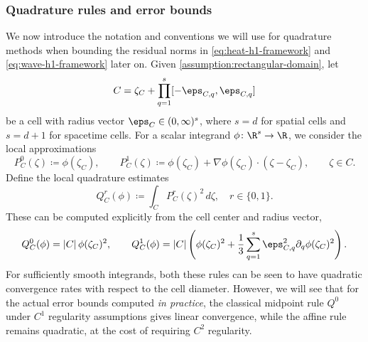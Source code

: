 \subsubsection{Quadrature rules and error bounds}
\label{subsubsec:cellwise-quadrature-bounds}
We now introduce the notation and conventions we will use for quadrature methods when bounding the residual norms in \eqref{eq:heat-h1-framework} and \eqref{eq:wave-h1-framework} later on. Given \cref{assumption:rectangular-domain}, let
\[
  C=\zeta_C+\prod_{q=1}^s[-\eps_{C,q},\eps_{C,q}]
\]
be a cell with radius vector $\boldsymbol{\eps}_C\in(0,\infty)^s$, where $s=d$ for spatial cells and $s=d+1$ for spacetime cells. For a scalar integrand $\phi \colon \R^s \to \R$, we consider the local
approximations
\begin{equation}\label{eq:cell-polynomial-models}
  P_C^0(\zeta)\coloneqq \phi(\zeta_C),
  \qquad
  P_C^1(\zeta)\coloneqq
  \phi(\zeta_C)+\nabla\phi(\zeta_C)\cdot(\zeta-\zeta_C),
  \qquad \zeta\in C.
\end{equation}
Define the local quadrature estimates
\begin{equation}\label{eq:cell-quadrature-rule}
  Q_C^r(\phi)
  \coloneqq
  \int_C P_C^r(\zeta)^2\,d\zeta, \quad r\in \{0,1\}.
\end{equation}
These can be computed explicitly from the cell center and radius vector,
\begin{equation}\label{eq:cell-quadrature-values}
  Q_C^0(\phi)=|C|\,\phi(\zeta_C)^2,
  \qquad
  Q_C^1(\phi)
  =
  |C|\left(\phi(\zeta_C)^2
  +\frac{1}{3}\sum_{q=1}^s\eps_{C,q}^2\partial_q\phi(\zeta_C)^2\right).
\end{equation}
For sufficiently smooth integrands, both these rules can be seen to have quadratic convergence rates with respect to the cell diameter. However, we will see that for the actual error bounds computed \emph{in practice}, the classical midpoint rule $Q^0$ under $C^1$ regularity assumptions gives linear convergence, while the affine rule remains quadratic, at the cost of requiring $C^2$ regularity.  

